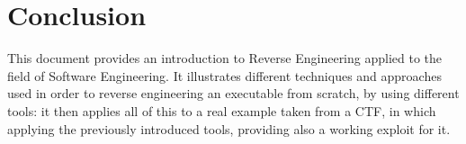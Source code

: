 \documentclass{article}
\begin{document}
\section{Conclusion}
This document provides an introduction to Reverse Engineering applied to the field of Software Engineering. It illustrates different techniques and approaches used in order to reverse engineering an executable from scratch, by using different tools:
it then applies all of this to a real example taken from a CTF, in which applying the previously introduced tools, providing also a working exploit for it.






\end{document}

